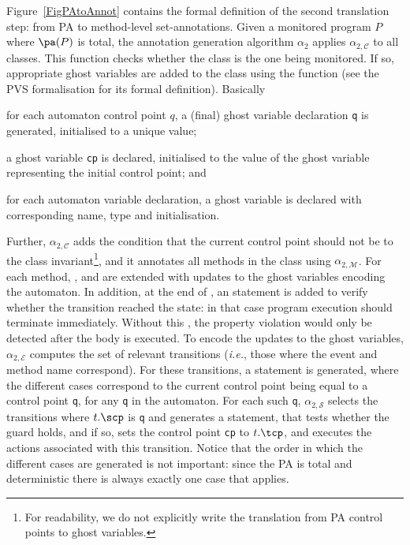 Figure~\ref{FigPAtoAnnot} contains the formal definition of the
second translation step: from PA to method-level set-annotations.
Given a monitored program \(P\) where \(\pa(P)\) is total,
the annotation generation algorithm \(\alpha_2\) applies
\(\alpha_{2, \mathcal{C}}\) to all classes.
This function checks whether the class is the one being
monitored. If so, appropriate ghost variables are added to the class
using the function \newgvs (see the PVS formalisation for its formal
definition). Basically
\begin{inparaenum}
\item for each automaton control point \(q\), a (final) ghost
variable declaration \texttt{q} is generated, initialised to a unique value;
\item a ghost variable \texttt{cp} is declared, initialised to the
value of the ghost variable representing the initial control point; and
\item for each automaton variable declaration, a ghost variable is
declared with corresponding name, type and initialisation.
\end{inparaenum}
Further, \(\alpha_{2, \mathcal{C}}\) adds the condition that the
current control point should not be \halted to the class
invariant\footnote{For readability, we do not explicitly write the
translation from PA control points to ghost variables.}, and it
annotates all methods in the class using \(\alpha_{2,
\mathcal{M}}\). For each method, \preset, \postset
and \excset are extended with updates to the ghost variables encoding
the automaton. In addition, at the end of \preset, an \Assert
statement is added to verify whether the transition reached the
\halted state: in that case program execution should terminate
immediately.  Without this \Assert, the property violation would only
be detected after the body is executed. To encode the updates to the
ghost variables, \(\alpha_{2, \mathcal{E}}\) computes the set of
relevant transitions (\emph{i.e.}, those where the event and method
name correspond). For these transitions, a \CaseJML statement is
generated, where the different cases correspond to the current control
point being equal to a control point \texttt{q}, for any
\texttt{q} in the automaton. For each such \texttt{q}, \(\alpha_{2,
\mathcal{S}}\) selects the transitions where \(t.\scp\) is \texttt{q}
and generates a \CaseJML statement, that tests whether the guard
holds, and if so, sets the control point \texttt{cp} to
\(t.\tcp\), and executes the actions associated with this
transition.  Notice that the order in which the different cases are
generated is not important: since the PA is total and deterministic
there is always exactly one case that applies.

